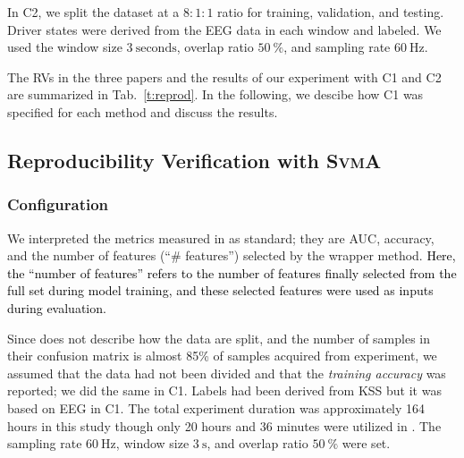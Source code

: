 \documentclass[letterpaper, 10 pt, conference]{ieeeconf}  %
\newcommand{\Review}[1]{\textcolor{black}{#1}}
\newcommand{\Impl}[1]{\textsc{#1}}
\begin{document}

In C2, we split the dataset at a $8:1:1$ ratio for training, validation, and testing.
Driver states were derived from the EEG data in each window and labeled.
{We used the window size $3~\mathrm{seconds}$, overlap ratio $50~\mathrm{\%}$, and sampling rate $60~\mathrm{Hz}$.}

The RVs in the three papers and the results of our experiment with C1 and C2 are summarized in Tab.~\ref{t:reprod}.
%
In the following, we descibe how C1 was specified for each method and discuss the results.

\subsection{Reproducibility Verification with \Impl{SvmA}}

\subsubsection{Configuration}

We interpreted the metrics measured in \cite{Arefnezhad2019} as standard; they are AUC, accuracy, and the number of features (``\# features'') selected by the wrapper method.
\Review{Here, the ``number of features'' refers to the number of features finally selected from the full set during model training, and these selected features were used as inputs during evaluation.}

Since \cite{Arefnezhad2019} does not describe how the data are split, and the number of samples in their confusion matrix is almost 85\% of samples acquired from experiment,  
we assumed that the data had not been divided and that the \emph{training accuracy} was reported; we did the same in C1.
Labels had been derived from KSS but it was based on EEG in C1.
{The total experiment duration was approximately 164 hours in this study though only 20 hours and 36 minutes were utilized in \cite{Arefnezhad2019}.}
{The sampling rate $60~\mathrm{Hz}$, window size $3~\mathrm{s}$, and overlap ratio $50~\mathrm{\%}$ were set.}
\end{document}
